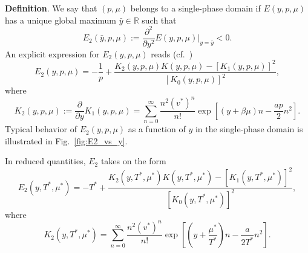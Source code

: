 \documentclass[12pt]{article}
\numberwithin{equation}{section}
\begin{document}
	\textbf{Definition}. We say that $(p, \mu)$ belongs to a single-phase domain if $E(y,p,\mu)$ has a unique global maximum $\bar{y} \in \mathbb{R}$ such that
	\begin{equation}
		\label{def:E2}
		E_2(\bar{y}, p, \mu) := \frac{\partial^2}{\partial y^2} E(y,p,\mu)\big|_{y=\bar{y}} < 0.
	\end{equation}
	An explicit expression for $E_2(y,p,\mu)$ reads (cf.~\cite[(20)]{KD22})
	\begin{equation}
		E_2(y,p,\mu) = -\frac{1}{p} + \frac{K_2(y,p,\mu) K(y,p,\mu) - [K_1(y,p,\mu)]^2}{[K_0(y,p,\mu)]^2},
	\end{equation}
	where
	\begin{equation}
		K_2(y,p,\mu) := \frac{\partial}{\partial y} K_1(y,p,\mu) = \sum_{n=0}^{\infty} \frac{n^2 (v^*)^n}{n!} \exp[(y+\beta\mu)n - \frac{ap}{2}n^2].
	\end{equation}
	Typical behavior of $E_2(y,p,\mu)$ as a function of $y$ in the single-phase domain is illustrated in Fig.~\ref{fig:E2_vs_y}.
	
	\begin{mdframed}[linecolor=black,linewidth=1pt,leftline=true]
		In reduced quantities, $E_2$ takes on the form
		\begin{equation}
			\label{def:reducedE2}
			E_2(y,T^*,\mu^*) = -T^* + \frac{K_2(y,T^*,\mu^*) K(y,T^*,\mu^*) - [K_1(y,T^*,\mu^*)]^2}{[K_0(y,T^*,\mu^*)]^2},
		\end{equation}
		where
		\begin{equation}
			K_2(y,T^*,\mu^*) = \sum_{n=0}^{\infty} \frac{n^2 (v^*)^n}{n!} \exp[\left(y+\frac{\mu^*}{T^*}\right)n - \frac{a}{2T^*}n^2].
		\end{equation}
	\end{mdframed}
	
\end{document}
